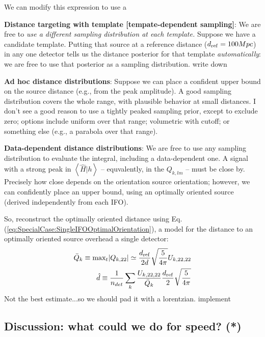 \documentclass[twocolumn,prd,nofootinbib]{revtex4}
\newcommand\editremark[1]{{\color{red} #1}}
\newcommand\qmstateproduct[2]{\left\langle#1|#2\right\rangle}
\begin{document}
\begin{widetext}
\begin{shaded}
We can modify this expression to use a 

\noindent \textbf{Distance targeting with template [tempate-dependent sampling]}: We are free to \emph{use a different
  sampling distribution at each template.}  Suppose we have a candidate template.  Putting that source at a
reference distance ($d_{\rm ref}=100 Mpc$) in any one detector tells us the distance posterior for that template \emph{automatically}: we
are free to use that posterior as a sampling distribution.   \editremark{write down}
\end{shaded}


\noindent \textbf{Ad hoc distance distributions}: Suppose we can place a confident upper bound on the source distance (e.g.,
from the peak amplitude).  A good sampling distribution covers the whole range, with plausible behavior at small
distances.
%
I don't see a good reason to use a tightly peaked sampling prior, except to exclude zero; options include  uniform over
that range; volumetric with cutoff; or something else (e.g., a parabola over that range).



\noindent \textbf{Data-dependent distance distributions}: We are free to use any sampling distribution to evaluate the
integral, including a data-dependent one.   A signal with a strong peak in $\qmstateproduct{\hat{H}}{h}$ -- equvalently,
in the $Q_{k,lm}$ -- must be close by.  Precisely how close depends on the orientation source orientation; however, we
can confidently place an upper bound, using an optimally oriented source (derived independently from each IFO).

So,  reconstruct the optimally oriented distance using Eq. (\ref{eq:SpecialCase:SingleIFOOptimalOrientation}), a model for the distance to an
optimally oriented source overhead a single detector:
\begin{eqnarray}
\bar{Q}_k \equiv  \text{max}_t |Q_{k,22}| \simeq \frac{d_{\rm ref}}{2 d} \sqrt{\frac{5}{4\pi}} U_{k,22,22} \\
\hat{d} \equiv \frac{1}{n_{det}}\sum_k\frac{U_{k,22,22}}{\bar{Q}_k} \frac{d_{\rm ref}}{2} \sqrt{\frac{5}{4\pi}}
\end{eqnarray}
Not the best estimate...so we should pad it with a lorentzian. \editremark{implement}

\end{widetext}


\subsection{Discussion: what could we do for speed? (*)}
\end{document}

